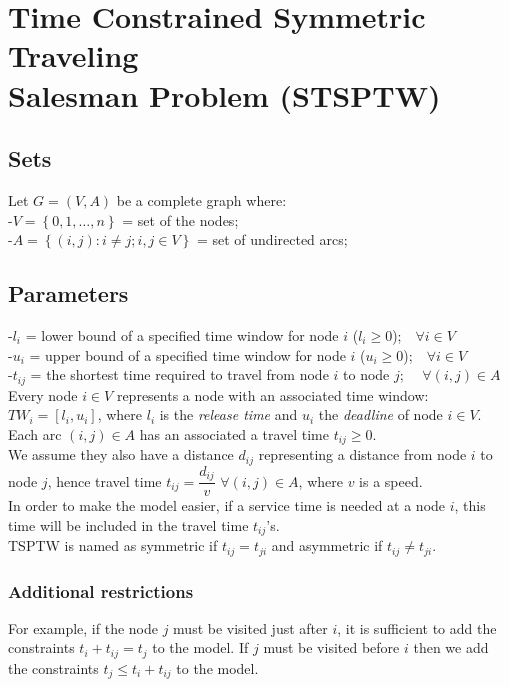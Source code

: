 \documentclass[a4paper,12pt,titlepage]{article}
\begin{document}
\section*{Time Constrained Symmetric Traveling\\ Salesman Problem (STSPTW)}
\subsection*{Sets}
Let $G = (V, A)$ be a complete graph where: \\
-$V=\left \lbrace 0,1, …, n\right\rbrace$ = set of the nodes;\\
-$A=\left \lbrace(i, j): i \neq j; i,j\in V\right\rbrace$ = set of undirected arcs;
\subsection*{Parameters}
-$l_i$ = lower bound of a specified time window for node $i$ ($l_i\geq 0$);\,\,\,\ $\forall i\in V$\\
-$u_i$ = upper bound of a specified time window for node $i$ ($u_i\geq 0$);\,\,\,\ $\forall i\in V$\\
-$t_{ij}$ = the shortest time required to travel from node $i$ to node $j$;
\,\,\,\ $\forall(i,j)\in A$\\
Every node $i\in V$ represents a node with an associated time window:\\
$TW_i=[l_i, u_i]$, where
$l_i$ is the  \textit{release time} and $u_i$ the \textit{deadline} of node $i\in V$. \\
Each arc $(i, j) \in A$ has
an associated a travel time $t_{ij} \geq 0$.\\
We assume they also have a distance  $d_{ij}$ representing a distance from node $i$ to node $j$, hence travel time $t_{ij} = \dfrac{d_{ij}}{v}$ $\forall (i,j)\in A$, where $v$ is a speed.\\
In order to make the model easier, if a service time is needed at a node $i$, this time will be included in the travel time $t_{ij}$’s.\\
TSPTW is named as symmetric if $t_{ij}= t_{ji}$ and asymmetric if $t_{ij} \neq t_{ji}$.
\subsubsection*{Additional restrictions}
For example, if the node $j$ must be visited just after $i$, it is sufficient to add the constraints $t_i + t_{ij}= t_j$ to the model. If $j$ must be visited before $i$
then we add the constraints $t_j \leq t_i + t_{ij}$ to the model.
\end{document}
